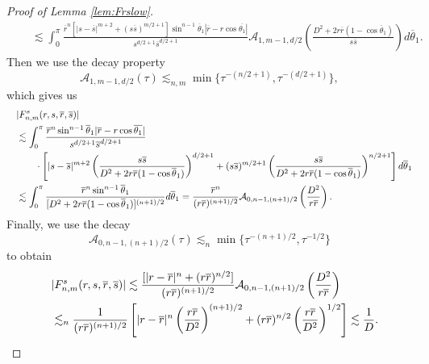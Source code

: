 \documentclass[10pt,a4paper]{amsart}
\newcommand{\br}[1]{\overline{#1}}
\newcommand{\calA}{\mathcal A}
\newcommand{\tht}{\theta}
\begin{document}
\begin{proof}[Proof of Lemma \ref{lem:Frslow}]
\begin{equation}
\begin{aligned}
				\quad&\lesssim %
				\int_{0}^{\pi}\frac{\br{r}^{n}[|s-\br{s}|^{m+2}+(s\br{s})^{m/2+1}]\sin^{n-1}\br{\tht}_{1}|\br{r}-r\cos\br{\tht_{1}}|}{s^{d/2+1}\br{s}^{d/2+1}}\calA_{1,m-1,d/2}\left(\frac{D^{2}+2r\br{r}(1-\cos\br{\tht}_{1})}{s\br{s}}\right)d\br{\tht}_{1}.
			\end{aligned}
		\end{equation}
		Then we use the decay property
		\begin{equation}
			\calA_{1,m-1,d/2}(\tau)\lesssim_{n,m} \min\{ \tau^{-(n/2+1)},\tau^{-(d/2+1)}\},
		\end{equation}
		which gives us
		\begin{equation}
			\begin{aligned}
				&|F_{n,m}^{s}(r,s,\br{r},\br{s})|\\
				\quad&\lesssim %
				\int_{0}^{\pi}\frac{\br{r}^{n}\sin^{n-1}\br{\tht}_{1}|\br{r}-r\cos\br{\tht_{1}}|}{s^{d/2+1}\br{s}^{d/2+1}}\\
				&\qquad\cdot\left[|s-\br{s}|^{m+2}\left( \frac{s\br{s}}{D^{2}+2r\br{r}(1-\cos\br{\tht}_{1})}\right)^{d/2+1}+(s\br{s})^{m/2+1} \left( \frac{s\br{s}}{D^{2}+2r\br{r}(1-\cos\br{\tht}_{1})}\right)^{n/2+1}\right]d\br{\tht}_{1}\\
				\quad&\lesssim \int_{0}^{\pi}\frac{%
					\br{r}^{n}\sin^{n-1}\br{\tht}_{1}}{[D^{2}+2r\br{r}(1-\cos\br{\tht}_{1})]^{(n+1)/2}}d\br{\tht}_{1}=\frac{\br{r}^{n}}{(r\br{r})^{(n+1)/2}}\calA_{0,n-1,(n+1)/2}\left(\frac{D^{2}}{r\br{r}}\right).
			\end{aligned}
		\end{equation}
		Finally, we use the decay
		\begin{equation}
			\calA_{0,n-1,(n+1)/2}(\tau)\lesssim_{n} \min\{ \tau^{-(n+1)/2},\tau^{-1/2}\}
		\end{equation}
		to obtain
		\begin{equation}
			\begin{aligned}
				&|F_{n,m}^{s}(r,s,\br{r},\br{s})|\lesssim %
				\frac{[|r-\br{r}|^{n}+(r\br{r})^{n/2}]}{(r\br{r})^{(n+1)/2}}\calA_{0,n-1,(n+1)/2}\left(\frac{D^{2}}{r\br{r}}\right)%
				\\
				\quad&\lesssim_{n} \frac{%
					1}{(r\br{r})^{(n+1)/2}}\left[|r-\br{r}|^{n}\left(\frac{r\br{r}}{D^{2}}\right)^{(n+1)/2}+(r\br{r})^{n/2}\left(\frac{r\br{r}}{D^{2}}\right)^{1/2}\right]\lesssim \frac{1%
				}{D}.
			\end{aligned}
		\end{equation}
	\end{proof}
\end{document}
